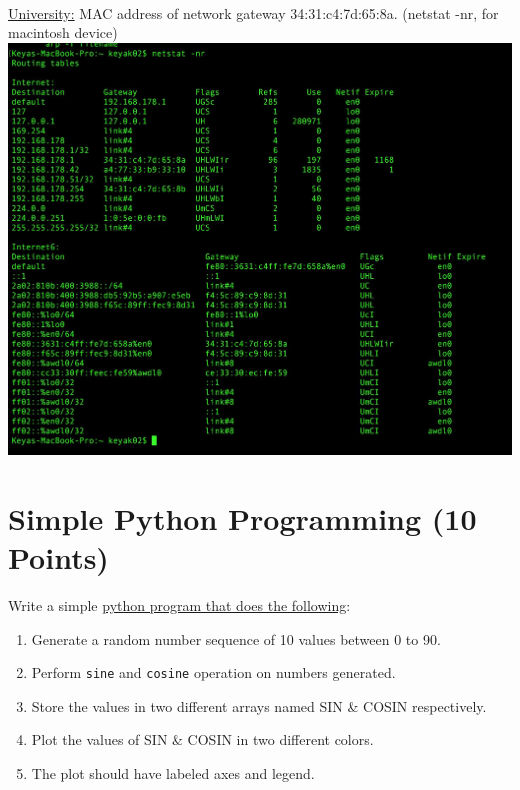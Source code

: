\documentclass{WeSTassignment}
\begin{document}
\begin{enumerate}
\\
\underline{University:} MAC address of network gateway 34:31:c4:7d:65:8a. (netstat -nr, for macintosh device) \\
\includegraphics[width=1\textwidth]{images/out-gateway-mac(6-0).png}
\\
\end{enumerate}


\section{Simple Python Programming (10 Points)}

Write a simple \underline{python program that does the following}:
\begin{enumerate}
\item Generate a random number sequence of 10 values between 0 to 90. 
\item Perform \texttt{sine} and \texttt{cosine} operation on numbers generated. 
\item Store the values in two different arrays named SIN \& COSIN respectively. 
\item Plot the values of SIN \& COSIN in two different colors. 
\item The plot should have labeled axes and legend.
\end{enumerate}
\end{document}
